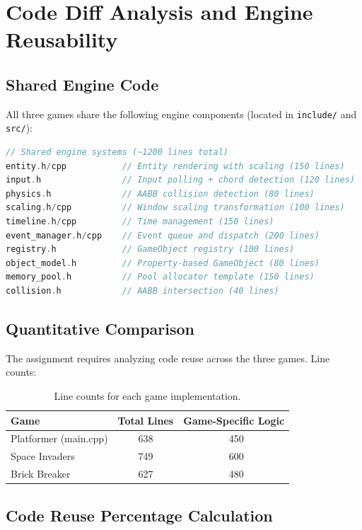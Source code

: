 \documentclass[12pt]{article}
\begin{document}
\section{Code Diff Analysis and Engine Reusability}

\subsection{Shared Engine Code}

All three games share the following engine components (located in \texttt{include/} and \texttt{src/}):

\begin{lstlisting}[language=C++]
// Shared engine systems (~1200 lines total)
entity.h/cpp           // Entity rendering with scaling (150 lines)
input.h                // Input polling + chord detection (120 lines)
physics.h              // AABB collision detection (80 lines)
scaling.h/cpp          // Window scaling transformation (100 lines)
timeline.h/cpp         // Time management (150 lines)
event_manager.h/cpp    // Event queue and dispatch (200 lines)
registry.h             // GameObject registry (100 lines)
object_model.h         // Property-based GameObject (80 lines)
memory_pool.h          // Pool allocator template (150 lines)
collision.h            // AABB intersection (40 lines)
\end{lstlisting}

\subsection{Quantitative Comparison}

The assignment requires analyzing code reuse across the three games. Line counts:

\begin{table}[h]
\centering
\caption{Line counts for each game implementation.}
\label{tab:lines}
\begin{tabular}{@{}lcc@{}}
\toprule
Game & Total Lines & Game-Specific Logic \\ \midrule
Platformer (main.cpp) & 638 & ~450 \\
Space Invaders & 749 & ~600 \\
Brick Breaker & 627 & ~480 \\ \bottomrule
\end{tabular}
\end{table}

\subsection{Code Reuse Percentage Calculation}
\end{document}
